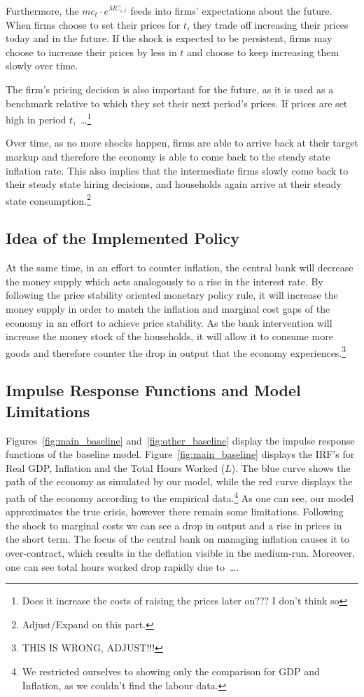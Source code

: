 \documentclass[12pt]{article}
\begin{document}
Furthermore, the $mc_t \cdot e^{MC_{s, t}}$ feeds into firms' expectations about the future. When firms choose to set their prices for $t$, they trade off increasing their prices today and in the future. If the shock is expected to be persistent, firms may choose to increase their prices by less in $t$ and choose to keep increasing them slowly over time. 

The firm's pricing decision is also important for the future, as it is used as a benchmark relative to which they set their next period's prices. If prices are set high in period $t$,\ \dots\footnote{Does it increase the costs of raising the prices later on??? I don't think so}

Over time, as no more shocks happen, firms are able to arrive back at their target markup and therefore the economy is able to come back to the steady state inflation rate. This also implies that the intermediate firms slowly come back to their steady state hiring decisions, and households again arrive at their steady state consumption.\footnote{Adjust/Expand on this part.}

\subsection*{Idea of the Implemented Policy}

At the same time, in an effort to counter inflation, the central bank will decrease the money supply which acts analogously to a rise in the interest rate. By following the price stability oriented monetary policy rule, it will increase the money supply in order to match the inflation and marginal cost gaps of the economy in an effort to achieve price stability. As the bank intervention will increase the money stock of the households, it will allow it to consume more goods and therefore counter the drop in output that the economy experiences.\footnote{THIS IS WRONG, ADJUST!!!}

\subsection*{Impulse Response Functions and Model Limitations}

Figures~\ref{fig:main_baseline} and~\ref{fig:other_baseline} display the impulse response functions of the baseline model. Figure~\ref{fig:main_baseline} displays the IRF's for Real GDP, Inflation and the Total Hours Worked ($L$). The blue curve shows the path of the economy as simulated by our model, while the red curve displays the path of the economy according to the empirical data.\footnote{We restricted ourselves to showing only the comparison for GDP and Inflation, as we couldn't find the labour data.} As one can see, our model approximates the true crisis, however there remain some limitations. Following the shock to marginal costs we can see a drop in output and a rise in prices in the short term. The focus of the central bank on managing inflation causes it to over-contract, which results in the deflation visible in the medium-run. Moreover, one can see total hours worked drop rapidly due to\ \dots. 
\end{document}
